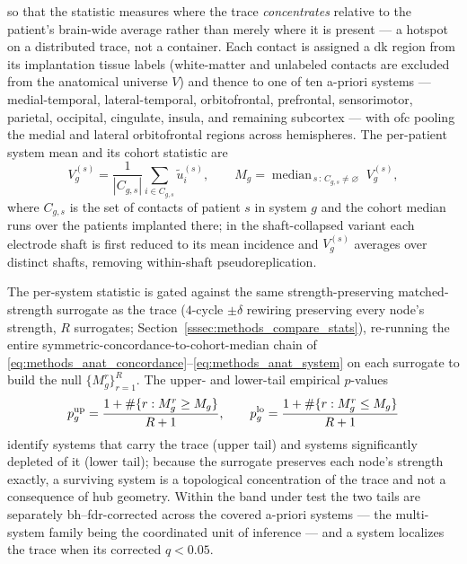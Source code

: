 so that the statistic measures where the trace \emph{concentrates} relative to the patient's brain-wide average rather than merely where it is present --- a hotspot on a distributed trace, not a container. Each contact is assigned a \gls{dk} region from its implantation tissue labels (white-matter and unlabeled contacts are excluded from the anatomical universe \(V\)) and thence to one of ten a-priori systems --- medial-temporal, lateral-temporal, orbitofrontal, prefrontal, sensorimotor, parietal, occipital, cingulate, insula, and remaining subcortex --- with \gls{ofc} pooling the medial and lateral orbitofrontal regions across hemispheres. The per-patient system mean and its cohort statistic are
\begin{equation}
    V_{g}^{(s)} = \frac{1}{|C_{g,s}|}\sum_{i \in C_{g,s}} \tilde{u}^{(s)}_{i}, \qquad M_{g} = \operatorname{median}_{\,s\,:\,C_{g,s} \neq \varnothing}\; V_{g}^{(s)},
    \label{eq:methods_anat_system}
\end{equation}
where \(C_{g,s}\) is the set of contacts of patient \(s\) in system \(g\) and the cohort median runs over the patients implanted there; in the shaft-collapsed variant each electrode shaft is first reduced to its mean incidence and \(V_{g}^{(s)}\) averages over distinct shafts, removing within-shaft pseudoreplication.

The per-system statistic is gated against the same strength-preserving matched-strength surrogate as the trace (\(4\)-cycle \(\pm\delta\) rewiring preserving every node's strength, \(R\) surrogates; Section~\ref{sssec:methods_compare_stats}), re-running the entire symmetric-concordance-to-cohort-median chain of \eqref{eq:methods_anat_concordance}--\eqref{eq:methods_anat_system} on each surrogate to build the null \(\{M_{g}^{r}\}_{r=1}^{R}\). The upper- and lower-tail empirical \(p\)-values
\begin{equation}
    p^{\rm up}_{g} = \frac{1 + \#\{r : M_{g}^{r} \ge M_{g}\}}{R+1}, \qquad p^{\rm lo}_{g} = \frac{1 + \#\{r : M_{g}^{r} \le M_{g}\}}{R+1}
    \label{eq:methods_anat_pval}
\end{equation}
identify systems that carry the trace (upper tail) and systems significantly depleted of it (lower tail); because the surrogate preserves each node's strength exactly, a surviving system is a topological concentration of the trace and not a consequence of hub geometry. Within the band under test the two tails are separately \gls{bh}--\gls{fdr}-corrected across the covered a-priori systems --- the multi-system family being the coordinated unit of inference --- and a system localizes the trace when its corrected \(q < \num{0.05}\).


